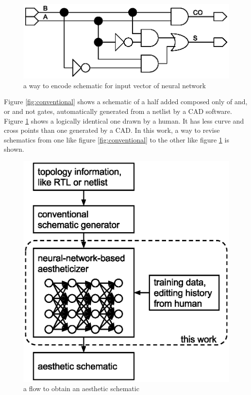 \documentclass[twocolumn]{article}
\begin{document}
\begin{figure}[tb]
 \begin{center}
  \begin{minipage}{\hsize}
   \includegraphics[width=\hsize]{human_ha.eps}
   \caption{a way to encode schematic for input vector of neural network}
   \label{fig:human_ha}
  \end{minipage}
 \end{center}
\end{figure}

Figure \ref{fig:conventional} shows a schematic of a half added
composed only of and, or and not gates, automatically generated
from a netlist by a CAD software.
Figure \ref{fig:human_ha} shows a logically identical one drawn by a human.
It has less curve and cross points than one generated by a CAD.
In this work, a way to revise schematics from one like
figure \ref{fig:conventional} to the other like figure \ref{fig:human_ha}
is shown.

\begin{figure}[tb]
 \begin{center}
  \begin{minipage}{\hsize}
   \includegraphics[width=\hsize]{flow.eps}
   \caption{a flow to obtain an aesthetic schematic}
   \label{fig:flow}
  \end{minipage}
 \end{center}
\end{figure}
\end{document}

